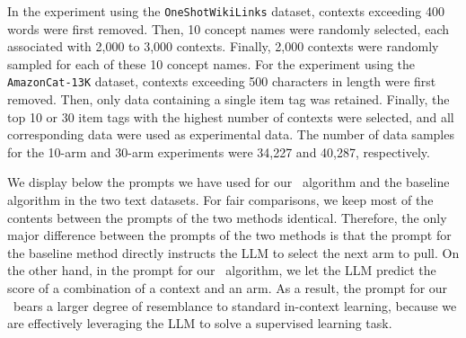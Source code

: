 In the experiment using the \texttt{OneShotWikiLinks} dataset, contexts exceeding 400 words were first removed. Then, 10 concept names were randomly selected, each associated with 2,000 to 3,000 contexts. Finally, 2,000 contexts were randomly sampled for each of these 10 concept names.
For the experiment using the \texttt{AmazonCat-13K} dataset, contexts exceeding 500 characters in length were first removed. Then, only data containing a single item tag was retained. Finally, the top 10 or 30 item tags with the highest number of contexts were selected, and all corresponding data were used as experimental data. The number of data samples for the 10-arm and 30-arm experiments were 34,227 and 40,287, respectively.

We display below the prompts we have used for our \algts~algorithm
and the baseline algorithm 
in the two text datasets.
For fair comparisons, we keep most of the contents between the prompts of the two methods identical. Therefore, the only major difference between the prompts of the two methods is that the prompt for the baseline method directly instructs the LLM to select the next arm to pull.
On the other hand, in the prompt for our \algts~algorithm, we let the LLM predict the score of a combination of a context and an arm.
As a result, the prompt for our \algts~bears a larger degree of resemblance to standard in-context learning, because we are effectively leveraging the LLM to solve a supervised learning task.


